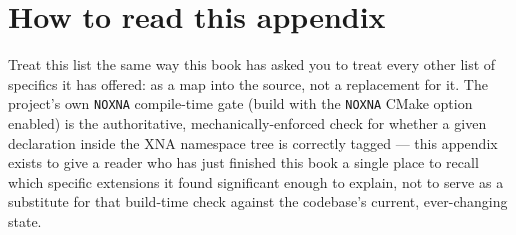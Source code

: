 \section{How to read this appendix}

Treat this list the same way this book has asked you to treat every other list of specifics
it has offered: as a map into the source, not a replacement for it. The project's own
\texttt{NOXNA} compile-time gate (build with the \texttt{NOXNA} CMake option enabled) is the
authoritative, mechanically-enforced check for whether a given declaration inside the XNA
namespace tree is correctly tagged --- this appendix exists to give a reader who has just
finished this book a single place to recall which specific extensions it found significant
enough to explain, not to serve as a substitute for that build-time check against the
codebase's current, ever-changing state.
